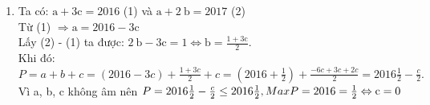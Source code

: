 \begin{bt}
{\begin{enumerate}
			\item Ta có: $\mathrm{a}+3 \mathrm{c}=2016$ (1) và $\mathrm{a}+2 \mathrm{~b}=2017$ (2)\\[5px]
			Từ (1) $\Rightarrow \mathrm{a}=2016-3 \mathrm{c}$\\[5px]
			Lấy (2) - (1) ta được: $2 \mathrm{~b}-3 \mathrm{c}=1 \Leftrightarrow \mathrm{b}=\frac{1+3 \mathrm{c}}{2}$.\\[5px]
			Khi đó:\\[5px]
			$
P=a+b+c=(2016-3 c)+\frac{1+3 c}{2}+c=\left(2016+\frac{1}{2}\right)+\frac{-6 c+3 c+2 c}{2}=2016 \frac{1}{2}-\frac{c}{2} .
$\\[5px]
Vì a, b, c không âm nên $P=2016 \frac{1}{2}-\frac{c}{2} \leq 2016 \frac{1}{2}, MaxP=2016 = \frac{1}{2}\\[5px] \Leftrightarrow \mathrm{c}=0$
		\end{enumerate}
	}
\end{bt}